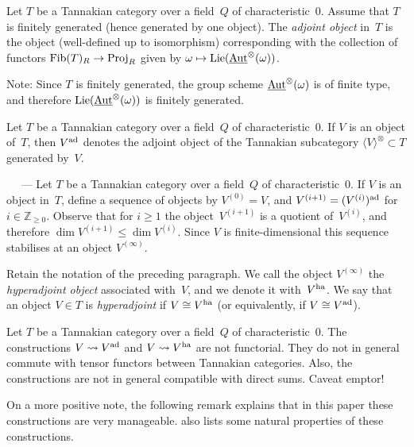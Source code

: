\documentclass[10pt,twoside,leqno]{article}
\renewcommand{\paragraph}[1]{\par\bigskip\refstepcounter{subsection}%
 {\normalfont\normalsize\scshape\noindent\thesubsection%
 \ifthenelse{\equal{#1}{}}%
 {}%
 {\ \textls{#1.}}%
 \ ---}%
}
\numberwithin{equation}{subsection}
\newcommand{\Aut}{\textnormal{Aut}}
\newcommand{\iAut}{\underline{\Aut}}
\newcommand{\ZZ}{\mathbb{Z}}
\newcommand{\Lie}{\textnormal{Lie}}
\newcommand{\ad}{\textnormal{ad}}
\newcommand{\ha}{\textnormal{ha}}
\newcommand{\Fib}{\textnormal{Fib}}
\newcommand{\Proj}{\textnormal{Proj}}
\newcommand{\Tangen}[1]{\langle #1 \rangle^{\otimes}}
\begin{document}
\begin{definition} %
 Let $T$ be a Tannakian category over a field~$Q$ of characteristic~$0$.
 Assume that $T$ is finitely generated (hence generated by one object).
 The \emph{adjoint object} in~$T$ is the object
 (well-defined up to isomorphism)
 corresponding with the collection of functors
 $\Fib(T)_R \to \Proj_R$ given by $\omega \mapsto \Lie(\iAut^\otimes(\omega))$.
 
 Note: Since $T$ is finitely generated,
 the group scheme $\iAut^\otimes(\omega)$ is of finite type,
 and therefore $\Lie(\iAut^\otimes(\omega))$ is finitely generated.
\end{definition}

\begin{notation} %
 Let $T$ be a Tannakian category over a field~$Q$ of characteristic~$0$.
 If $V$ is an object of~$T$,
 then $V^\ad$ denotes the adjoint object
 of the Tannakian subcategory $\Tangen{V} \subset T$ generated by~$V$.
\end{notation}

\paragraph{} %
Let $T$ be a Tannakian category over a field~$Q$ of characteristic~$0$.
If $V$ is an object in~$T$,
define a sequence of objects by $V^{(0)} = V$,
and $V^{(i+1)} = (V^{(i)})^\ad$ for $i \in \ZZ_{\ge0}$.
Observe that for $i \ge 1$ the object~$V^{(i+1)}$ is a quotient of~$V^{(i)}$,
and therefore $\dim V^{(i+1)} \le \dim V^{(i)}$.
Since $V$ is finite-dimensional
this sequence stabilises at an object $V^{(\infty)}$.

\begin{definition} %
 \label{ha-obj}
 Retain the notation of the preceding paragraph.
 We call the object $V^{(\infty)}$ the \emph{hyperadjoint object}
 associated with~$V$, and we denote it with~$V^\ha$.
 We say that an object $V \in T$ is \emph{hyperadjoint} if $V \cong V^\ha$
 (or equivalently, if $V \cong V^\ad$).
\end{definition}

\begin{remark} %
 Let $T$ be a Tannakian category over a field~$Q$ of characteristic~$0$.
 The constructions $V \rightsquigarrow V^\ad$ and $V \rightsquigarrow V^\ha$
 are not functorial.
 They do not in general commute with
 tensor functors between Tannakian categories.
 Also, the constructions are not in general compatible with direct sums.
 Caveat emptor!

 On a more positive note, the following remark explains that in this paper
 these constructions are very manageable.
  also lists some natural properties of these constructions.
\end{remark}
\end{document}
